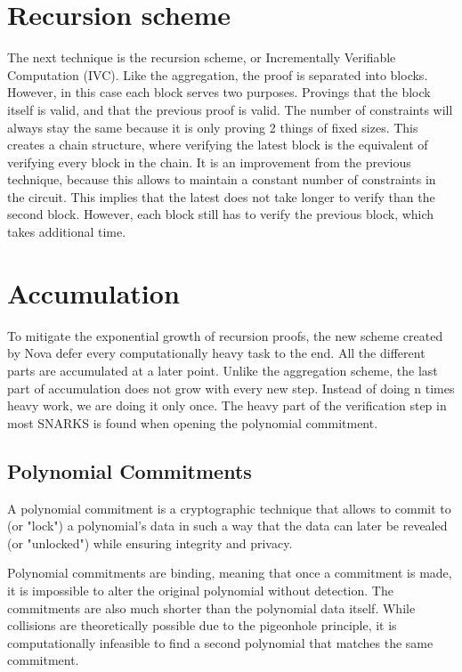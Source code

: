 \section{Recursion scheme}
The next technique is the recursion scheme, or Incrementally Verifiable Computation (IVC). Like the aggregation, the proof is separated into blocks.
However, in this case each block serves two purposes. Provings that the block itself is valid, and that the previous proof is valid.
The number of constraints will always stay the same because it is only proving 2 things of fixed sizes. This creates
a chain structure, where verifying the latest block is the equivalent of verifying every block in the chain.
It is an improvement from the previous technique, because this allows to maintain a constant number of constraints in the circuit.
This implies that the latest does not take longer to verify than the second block.
However, each block still has to verify the previous block, which takes additional time. \cite{Nova23}


\section{Accumulation}
To mitigate the exponential growth of recursion proofs, the new scheme created by Nova defer every computationally heavy task to the end.
All the different parts are accumulated at a later point. Unlike the aggregation scheme, the last part of accumulation does not grow with every new step.
Instead of doing n times heavy work, we are doing it only once.
The heavy part of the verification step in most SNARKS is found when opening the polynomial commitment.


\subsection{Polynomial Commitments}
\label{subsec:pc}
A polynomial commitment is a cryptographic technique that allows to commit to (or "lock") a polynomial's data 
in such a way that the data can later be revealed (or "unlocked") while ensuring integrity and privacy.

Polynomial commitments are binding, meaning that once a commitment is made, it is impossible to alter the original polynomial without detection. 
The commitments are also much shorter than the polynomial data itself. While collisions are theoretically possible due to the pigeonhole principle, 
it is computationally infeasible to find a second polynomial that matches the same commitment.

